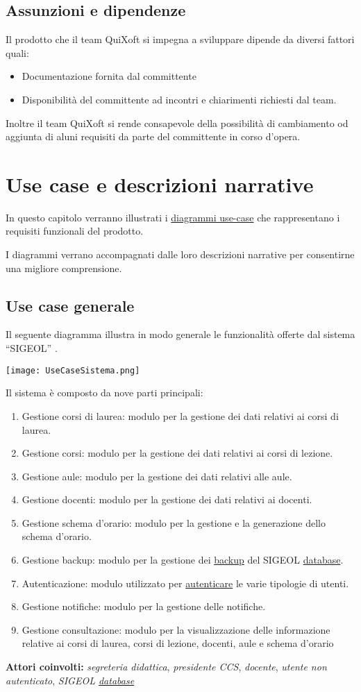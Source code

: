 \documentclass[11pt,a4paper]{article}
\begin{document}
\subsection{Assunzioni e dipendenze}
Il prodotto che il team QuiXoft si impegna a sviluppare dipende da diversi fattori quali:
\begin{itemize}
 \item Documentazione fornita dal committente
 \item Disponibilità del committente ad incontri e chiarimenti richiesti dal team.
\end{itemize}
Inoltre il team QuiXoft si rende consapevole della possibilità di cambiamento od aggiunta di aluni requisiti da parte del committente in corso d'opera.
\section{Use case e descrizioni narrative}
In questo capitolo verranno illustrati i \underline{diagrammi use-case} che rappresentano
i requisiti funzionali del prodotto.

I diagrammi verrano accompagnati dalle loro descrizioni narrative per consentirne
una migliore comprensione.
\subsection{Use case generale}
Il seguente diagramma illustra in modo generale le funzionalità offerte dal sistema ``SIGEOL'' .
\begin{center}
 \texttt{[image: UseCaseSistema.png]}
\end{center}

Il sistema è composto da nove parti principali:
\begin{enumerate}
\item Gestione corsi di laurea: modulo per la gestione dei dati relativi ai corsi di laurea.
\item Gestione corsi: modulo per la gestione dei dati relativi ai corsi di lezione.
\item Gestione aule: modulo per la gestione dei dati relativi alle aule.
\item Gestione docenti: modulo per la gestione dei dati relativi ai docenti.
\item Gestione schema d'orario: modulo per la gestione e la generazione dello schema d'orario.
\item Gestione backup: modulo per la gestione dei \underline{backup} del SIGEOL \underline{database}.
\item Autenticazione: modulo utilizzato per \underline{autenticare} le varie tipologie di utenti.
\item Gestione notifiche: modulo per la gestione delle notifiche.
\item Gestione consultazione: modulo per la visualizzazione delle informazione relative ai corsi di laurea, corsi di lezione, docenti, aule e schema d'orario
\end{enumerate}
\textbf{Attori coinvolti:}
\textit{segreteria didattica}, \textit{presidente CCS}, \textit{docente}, \textit{utente non autenticato}, \textit{SIGEOL \underline{database}}
\end{document}
